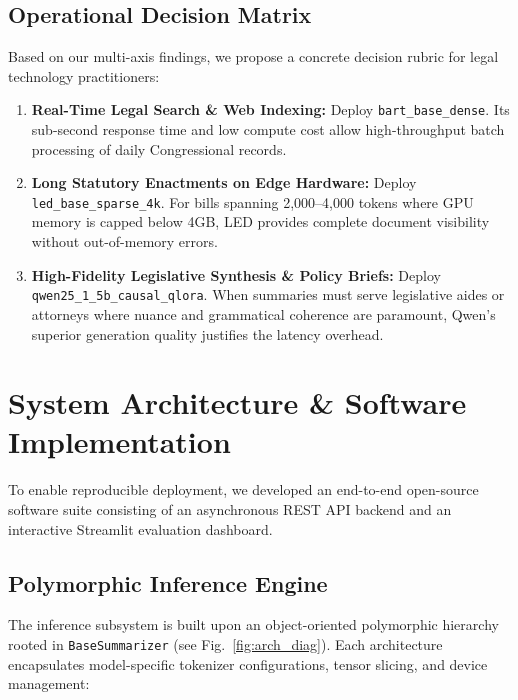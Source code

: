 \documentclass[conference]{IEEEtran}
\begin{document}
\subsection{Operational Decision Matrix}
Based on our multi-axis findings, we propose a concrete decision rubric for legal technology practitioners:
\begin{enumerate}
    \item \textbf{Real-Time Legal Search \& Web Indexing:} Deploy \texttt{bart\_base\_dense}. Its sub-second response time and low compute cost allow high-throughput batch processing of daily Congressional records.
    \item \textbf{Long Statutory Enactments on Edge Hardware:} Deploy \texttt{led\_base\_sparse\_4k}. For bills spanning 2,000--4,000 tokens where GPU memory is capped below 4GB, LED provides complete document visibility without out-of-memory errors.
    \item \textbf{High-Fidelity Legislative Synthesis \& Policy Briefs:} Deploy \texttt{qwen25\_1\_5b\_causal\_qlora}. When summaries must serve legislative aides or attorneys where nuance and grammatical coherence are paramount, Qwen's superior generation quality justifies the latency overhead.
\end{enumerate}

\section{System Architecture \& Software Implementation}
\label{sec:system}
To enable reproducible deployment, we developed an end-to-end open-source software suite consisting of an asynchronous REST API backend and an interactive Streamlit evaluation dashboard.

\subsection{Polymorphic Inference Engine}
The inference subsystem is built upon an object-oriented polymorphic hierarchy rooted in \texttt{BaseSummarizer} (see Fig.~\ref{fig:arch_diag}). Each architecture encapsulates model-specific tokenizer configurations, tensor slicing, and device management:
\end{document}

